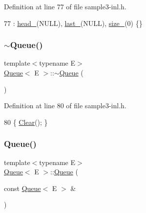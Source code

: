 Definition at line 77 of file sample3-\/inl.\+h.


\begin{DoxyCode}
77 : \hyperlink{classQueue_abf9219bcea800d26e8bfdb4777d98729}{head\_}(NULL), \hyperlink{classQueue_a7466dca4f96147c9124af582ab170df0}{last\_}(NULL), \hyperlink{classQueue_a7ac3c0717d894e1aecc56f4ddb35c7ea}{size\_}(0) \{\}
\end{DoxyCode}
\mbox{\label{classQueue_a49fe82adb8dc2fb62ab53876a6933d0f}} 
\subsubsection{\texorpdfstring{$\sim$\+Queue()}{~Queue()}}
{\footnotesize\ttfamily template$<$typename E$>$ \\
\hyperlink{classQueue}{Queue}$<$ E $>$\+::$\sim$\hyperlink{classQueue}{Queue} (\begin{DoxyParamCaption}{ }\end{DoxyParamCaption})\hspace{0.3cm}{\ttfamily [inline]}}



Definition at line 80 of file sample3-\/inl.\+h.


\begin{DoxyCode}
80 \{ \hyperlink{classQueue_acfdd5f9f7e936ca30dcf877370ef9510}{Clear}(); \}
\end{DoxyCode}
\mbox{\label{classQueue_ac071ee553005a67737d35edeeaafca5b}} 
\subsubsection{\texorpdfstring{Queue()}{Queue()}\hspace{0.1cm}{\footnotesize\ttfamily [2/2]}}
{\footnotesize\ttfamily template$<$typename E$>$ \\
\hyperlink{classQueue}{Queue}$<$ E $>$\+::\hyperlink{classQueue}{Queue} (\begin{DoxyParamCaption}\item[{const \hyperlink{classQueue}{Queue}$<$ E $>$ \&}]{ }\end{DoxyParamCaption})\hspace{0.3cm}{\ttfamily [private]}}



